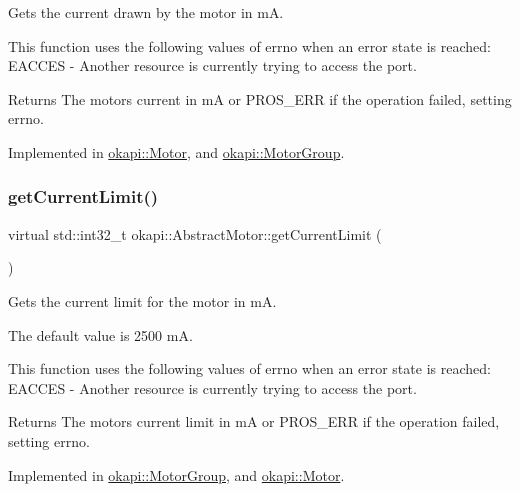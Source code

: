 Gets the current drawn by the motor in mA.

This function uses the following values of errno when an error state is reached\+: E\+A\+C\+C\+ES -\/ Another resource is currently trying to access the port.

\begin{DoxyReturn}{Returns}
The motor\textquotesingle{}s current in mA or P\+R\+O\+S\+\_\+\+E\+RR if the operation failed, setting errno. 
\end{DoxyReturn}


Implemented in \mbox{\hyperlink{classokapi_1_1Motor_ac5107f8aef228d4b4fec06d549c55cf6}{okapi\+::\+Motor}}, and \mbox{\hyperlink{classokapi_1_1MotorGroup_a5cdc06b92c943b2348130b162f6c5f16}{okapi\+::\+Motor\+Group}}.

\mbox{\label{classokapi_1_1AbstractMotor_ab83ef3319ffe1cb1d020e5a10127aab8}} 
\subsubsection{\texorpdfstring{getCurrentLimit()}{getCurrentLimit()}}
{\footnotesize\ttfamily virtual std\+::int32\+\_\+t okapi\+::\+Abstract\+Motor\+::get\+Current\+Limit (\begin{DoxyParamCaption}{ }\end{DoxyParamCaption})\hspace{0.3cm}{\ttfamily [pure virtual]}}

Gets the current limit for the motor in mA.

The default value is 2500 mA.

This function uses the following values of errno when an error state is reached\+: E\+A\+C\+C\+ES -\/ Another resource is currently trying to access the port.

\begin{DoxyReturn}{Returns}
The motor\textquotesingle{}s current limit in mA or P\+R\+O\+S\+\_\+\+E\+RR if the operation failed, setting errno. 
\end{DoxyReturn}


Implemented in \mbox{\hyperlink{classokapi_1_1MotorGroup_afe3f1ed73d64cc7204074d5cdb2a874e}{okapi\+::\+Motor\+Group}}, and \mbox{\hyperlink{classokapi_1_1Motor_ae309fb32ea479cec950dfaa65f3ffebd}{okapi\+::\+Motor}}.

